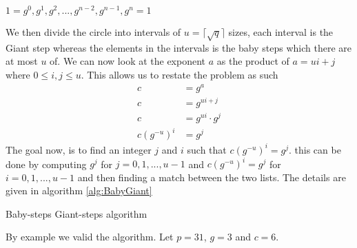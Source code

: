 \begin{center}
    $1 = g^0, g^1, g^2,...,g^{n-2}, g^{n-1}, g^n = 1$
\end{center}

\noindent
We then divide the circle into intervals of $u = \lceil \sqrt{q} \rceil$ sizes, each interval is the Giant step whereas the elements in the intervals is the baby steps which there are at most $u$ of. We can now look at the exponent $a$ as the product of $a = ui + j$ where $0 \leq i,j \leq u$. This allows us to restate the problem as such
\begin{align*}
    c           &= g^a                  \\
    c           &= g^{ui + j}           \\ 
    c           &= g^{ui} \cdot g^{j}   \\
    c( g^{-u} )^i &= g^{j}                
\end{align*}
\noindent
The goal now, is to find an integer $j$ and $i$ such that $c( g^{-u} )^i = g^{j}$. this can be done by computing $g^{j}$ for $j = 0,1,...,u-1$ and $c( g^{-u} )^i = g^{j}$ for  $i = 0,1,...,u-1$ and then finding a match between the two lists. The details are given in algorithm \ref{alg:BabyGiant}

\begin{center}
\begin{algorithm}[H]
\caption{Baby-steps Giant-steps algorithm  \label{alg:BabyGiant}}



\end{algorithm}
\end{center}
\noindent
By example we valid the algorithm. Let $p = 31$, $g=3$ and $c = 6$.

